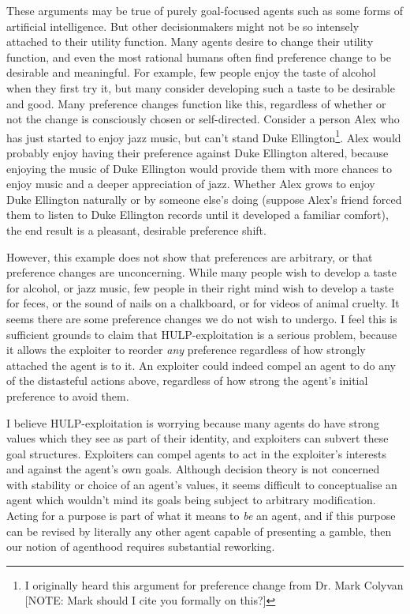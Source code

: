 \documentclass{article}
\begin{document}
These arguments may be true of purely goal-focused agents such as some forms of artificial intelligence. But other decisionmakers might not be so intensely attached to their utility function. Many agents desire to change their utility function, and even the most rational humans often find preference change to be desirable and meaningful. For example, few people enjoy the taste of alcohol when they first try it, but many consider developing such a taste to be desirable and good. Many preference changes function like this, regardless of whether or not the change is consciously chosen or self-directed. Consider a person Alex who has just started to enjoy jazz music, but can't stand Duke Ellington\footnote{I originally heard this argument for preference change from Dr. Mark Colyvan [NOTE: Mark should I cite you formally on this?]}. Alex would probably enjoy having their preference against Duke Ellington altered, because enjoying the music of Duke Ellington would provide them with more chances to enjoy music and a deeper appreciation of jazz. Whether Alex grows to enjoy Duke Ellington naturally or by someone else's doing (suppose Alex's friend forced them to listen to Duke Ellington records until it developed a familiar comfort), the end result is a pleasant, desirable preference shift.

However, this example does not show that preferences are arbitrary, or that preference changes are unconcerning. While many people wish to develop a taste for alcohol, or jazz music, few people in their right mind wish to develop a taste for feces, or the sound of nails on a chalkboard, or for videos of animal cruelty. It seems there are some preference changes we do not wish to undergo. I feel this is sufficient grounds to claim that HULP-exploitation is a serious problem, because it allows the exploiter to reorder \textit{any} preference regardless of how strongly attached the agent is to it. An exploiter could indeed compel an agent to do any of the distasteful actions above, regardless of how strong the agent's initial preference to avoid them.

I believe HULP-exploitation is worrying because many agents do have strong values which they see as part of their identity, and exploiters can subvert these goal structures. Exploiters can compel agents to act in the exploiter's interests and against the agent's own goals. Although decision theory is not concerned with stability or choice of an agent's values, it seems difficult to conceptualise an agent which wouldn't mind its goals being subject to arbitrary modification. Acting for a purpose is part of what it means to \textit{be} an agent, and if this purpose can be revised by literally any other agent capable of presenting a gamble, then our notion of agenthood requires substantial reworking.
\end{document}
